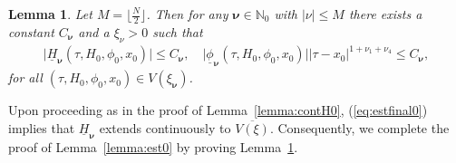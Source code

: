 \documentclass[reqno,12pt]{amsart}
\newcommand{\eqlab}[1]{\label{eq:#1}}
\renewcommand{\eqref}[1]{(\ref{eq:#1})}
\newcommand{\lemmaref}[1]{Lemma~\ref{lemma:#1}}
\newcommand{\lemmalab}[1]{\label{lemma:#1}}
\newtheorem{lemma}[theorem]{Lemma}
\numberwithin{equation}{section}
\begin{document}
\begin{lemma}\lemmalab{final}
Let $M=\lfloor \frac{N}{2}\rfloor$. Then for any $\mathbf \nu\in \mathbb N_0$ with $\vert \nu\vert \le M$ there exists a constant $C_{\mathbf \nu}$ and a $\xi_{\mathbb \nu}>0$ such that 
\begin{align}
 \vert \underline H_{\mathbf\nu}(\tau,H_0,\phi_0,x_0)\vert \le C_{\mathbf \nu},\quad \vert \underline \phi_{\mathbf\nu}(\tau,H_0,\phi_0,x_0)\vert\vert \tau-x_0\vert^{1+\nu_1+\nu_4}\le C_{\mathbf \nu},\eqlab{estfinal0}
\end{align}
for all $(\tau,H_0,\phi_0,x_0)\in V(\xi_{\mathbf \nu})$. 
\end{lemma}
Upon proceeding as in the proof of \lemmaref{contH0}, \eqref{estfinal0} implies that $\underline H_{\mathbf \nu}$ extends continuously to $\overline{V(\xi)}$. Consequently, we complete the proof of \lemmaref{est0} by proving \lemmaref{final}. 
\end{document}
